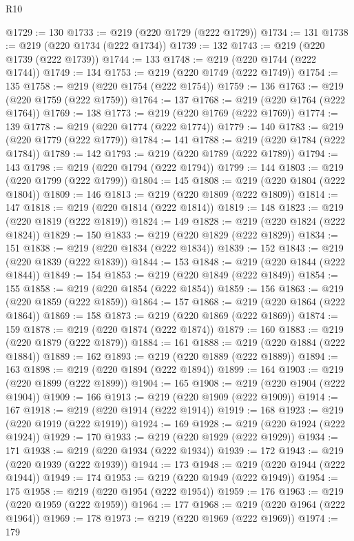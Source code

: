 \begin{lexlean}{R10}
\begin{coremodule}
{{{{{{{{{{{{{{{{{{{{{{{{{{{{{{{{{{{{{{{{{{{{{{{{{{{{{{{{{{{{{{{{{{{{{{{{{{{{{{{{{{{{{{{{{{{{{{{{{{{{{{{{{{{{@1729 := 130
@1733 := @219 (@220 @1729 (@222 @1729))
@1734 := 131
@1738 := @219 (@220 @1734 (@222 @1734))
@1739 := 132
@1743 := @219 (@220 @1739 (@222 @1739))
@1744 := 133
@1748 := @219 (@220 @1744 (@222 @1744))
@1749 := 134
@1753 := @219 (@220 @1749 (@222 @1749))
@1754 := 135
@1758 := @219 (@220 @1754 (@222 @1754))
@1759 := 136
@1763 := @219 (@220 @1759 (@222 @1759))
@1764 := 137
@1768 := @219 (@220 @1764 (@222 @1764))
@1769 := 138
@1773 := @219 (@220 @1769 (@222 @1769))
@1774 := 139
@1778 := @219 (@220 @1774 (@222 @1774))
@1779 := 140
@1783 := @219 (@220 @1779 (@222 @1779))
@1784 := 141
@1788 := @219 (@220 @1784 (@222 @1784))
@1789 := 142
@1793 := @219 (@220 @1789 (@222 @1789))
@1794 := 143
@1798 := @219 (@220 @1794 (@222 @1794))
@1799 := 144
@1803 := @219 (@220 @1799 (@222 @1799))
@1804 := 145
@1808 := @219 (@220 @1804 (@222 @1804))
@1809 := 146
@1813 := @219 (@220 @1809 (@222 @1809))
@1814 := 147
@1818 := @219 (@220 @1814 (@222 @1814))
@1819 := 148
@1823 := @219 (@220 @1819 (@222 @1819))
@1824 := 149
@1828 := @219 (@220 @1824 (@222 @1824))
@1829 := 150
@1833 := @219 (@220 @1829 (@222 @1829))
@1834 := 151
@1838 := @219 (@220 @1834 (@222 @1834))
@1839 := 152
@1843 := @219 (@220 @1839 (@222 @1839))
@1844 := 153
@1848 := @219 (@220 @1844 (@222 @1844))
@1849 := 154
@1853 := @219 (@220 @1849 (@222 @1849))
@1854 := 155
@1858 := @219 (@220 @1854 (@222 @1854))
@1859 := 156
@1863 := @219 (@220 @1859 (@222 @1859))
@1864 := 157
@1868 := @219 (@220 @1864 (@222 @1864))
@1869 := 158
@1873 := @219 (@220 @1869 (@222 @1869))
@1874 := 159
@1878 := @219 (@220 @1874 (@222 @1874))
@1879 := 160
@1883 := @219 (@220 @1879 (@222 @1879))
@1884 := 161
@1888 := @219 (@220 @1884 (@222 @1884))
@1889 := 162
@1893 := @219 (@220 @1889 (@222 @1889))
@1894 := 163
@1898 := @219 (@220 @1894 (@222 @1894))
@1899 := 164
@1903 := @219 (@220 @1899 (@222 @1899))
@1904 := 165
@1908 := @219 (@220 @1904 (@222 @1904))
@1909 := 166
@1913 := @219 (@220 @1909 (@222 @1909))
@1914 := 167
@1918 := @219 (@220 @1914 (@222 @1914))
@1919 := 168
@1923 := @219 (@220 @1919 (@222 @1919))
@1924 := 169
@1928 := @219 (@220 @1924 (@222 @1924))
@1929 := 170
@1933 := @219 (@220 @1929 (@222 @1929))
@1934 := 171
@1938 := @219 (@220 @1934 (@222 @1934))
@1939 := 172
@1943 := @219 (@220 @1939 (@222 @1939))
@1944 := 173
@1948 := @219 (@220 @1944 (@222 @1944))
@1949 := 174
@1953 := @219 (@220 @1949 (@222 @1949))
@1954 := 175
@1958 := @219 (@220 @1954 (@222 @1954))
@1959 := 176
@1963 := @219 (@220 @1959 (@222 @1959))
@1964 := 177
@1968 := @219 (@220 @1964 (@222 @1964))
@1969 := 178
@1973 := @219 (@220 @1969 (@222 @1969))
@1974 := 179
}}}}}}}}}}}}}}}}}}}}}}}}}}}}}}}}}}}}}}}}}}}}}}}}}}}}}}}}}}}}}}}}}}}}}}}}}}}}}}}}}}}}}}}}}}}}}}}}}}}}}}}}}}}}
\end{coremodule}
\end{lexlean}
